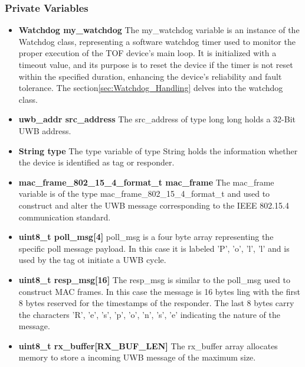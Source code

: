 \subsubsection{Private Variables}
\begin{itemize}
	\item \textbf{Watchdog my\_watchdog}
	\newline
	The my\_watchdog variable is an instance of the Watchdog class, representing a software watchdog timer used to monitor the proper execution of the TOF device's main loop. It is initialized with a timeout value, and its purpose is to reset the device if the timer is not reset within the specified duration, enhancing the device's reliability and fault tolerance. The section\ref{sec:Watchdog_Handling} delves into the watchdog class.
	
	\item \textbf{uwb\_addr src\_address}
	\newline
	The src\_address of type long long holds a 32-Bit UWB address. 
	
	\item \textbf{String type}
	\newline
	The type variable of type String holds the information whether the device is identified as tag or responder. 
	
	\item \textbf{mac\_frame\_802\_15\_4\_format\_t mac\_frame}
	\newline
	The mac\_frame variable is of the type mac\_frame\_802\_15\_4\_format\_t and used to construct and alter the UWB message corresponding to the IEEE 802.15.4 communication standard. 
	
	\item \textbf{uint8\_t poll\_msg[4]}
	\newline
	poll\_msg is a four byte array representing the specific poll message payload. 
	In this case it is labeled {'P', 'o', 'l', 'l'} and is used by the tag ot initiate a UWB cycle. 
	
	\item \textbf{uint8\_t resp\_msg[16]}
	\newline
	The resp\_msg is similar to the poll\_msg used to construct MAC frames. 
	In this case the message is 16 bytes ling with the first 8 bytes reserved for the timestamps of the responder. The last 8 bytes carry the characters 'R', 'e', 's', 'p', 'o', 'n', 's', 'e' indicating the nature of the message. 
	
	\item \textbf{uint8\_t rx\_buffer[RX\_BUF\_LEN]}
	\newline
	The rx\_buffer array allocates memory to store a incoming UWB message of the maximum size. 
	

\end{itemize}
